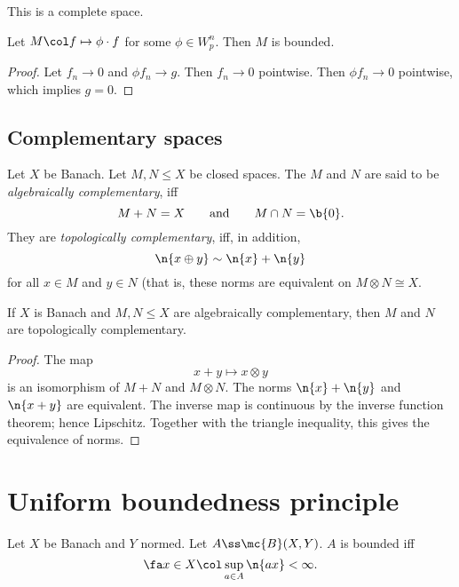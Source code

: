 \begin{lemma}
  This is a complete space.
\end{lemma}

\begin{theorem}
  Let $M \col f \mapsto \phi \cdot f$ for some $\phi \in W^n_p$. Then $M$ is bounded.
\end{theorem}

\begin{proof}
  Let $f_n \to 0$ and $\phi f_n \to g$.
  Then $f_n \to 0$ pointwise. 
  Then $\phi f_n \to 0$ pointwise, which implies $g = 0$.
\end{proof}

\subsection{Complementary spaces}

\begin{definition}
  Let $X$ be Banach.
  Let $M, N \le X$ be closed spaces.
  The $M$ and $N$ are said to be \emph{algebraically complementary}, iff
  $$ M+N=X \qquad\text{and}\qquad M \cap N = \b{0}. $$
  They are \emph{topologically complementary}, iff, in addition,
  $$ \n{x \oplus y} \sim \n{x}+\n{y} $$
  for all $x \in M$ and $y \in N$ (that is, these norms are equivalent on $M \otimes N \cong X$.
\end{definition}

\begin{theorem}
  If $X$ is Banach and $M, N \le X$ are algebraically complementary, then $M$ and $N$ are topologically complementary.
\end{theorem}

\begin{proof}
  The map
  $$ x + y \mapsto x \otimes y $$
  is an isomorphism of $M+N$ and $M \otimes N$.
  The norms $\n{x}+\n{y}$ and $\n{x+y}$ are equivalent.
  The inverse map is continuous by the inverse function theorem; hence Lipschitz.
  Together with the triangle inequality, this gives the equivalence of norms.
\end{proof}

\section{Uniform boundedness principle}

\begin{theorem}
  Let $X$ be Banach and $Y$ normed.
  Let $A \ss \mc{B}(X, Y)$.
  $A$ is bounded
  iff
  $$ \fa x \in X \col  \sup_{a \in A} \n{ax} < \infty. $$
\end{theorem}

